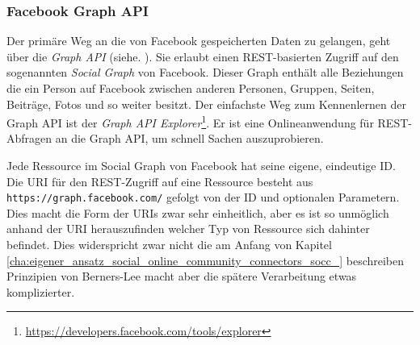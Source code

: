 
\subsubsection{Facebook Graph API} %
\label{ssub:facebook_graph_api}

Der primäre Weg an die von Facebook gespeicherten Daten zu gelangen, geht über die \emph{Graph API} (siehe. \cite{FacebookGraphAPI}). Sie erlaubt einen REST-basierten Zugriff auf den sogenannten \emph{Social Graph} von Facebook. Dieser Graph enthält alle Beziehungen die ein Person auf Facebook zwischen anderen Personen, Gruppen, Seiten, Beiträge, Fotos und so weiter besitzt. Der einfachste Weg zum Kennenlernen der Graph API ist der \emph{Graph API Explorer}\footnote{\url{https://developers.facebook.com/tools/explorer}}. Er ist eine Onlineanwendung für REST-Abfragen an die Graph API, um schnell Sachen auszuprobieren.

Jede Ressource im Social Graph von Facebook hat seine eigene, eindeutige ID. Die URI für den REST-Zugriff auf eine Ressource besteht aus \texttt{https://graph.facebook.com/} gefolgt von der ID und optionalen Parametern. Dies macht die Form der URIs zwar sehr einheitlich, aber es ist so unmöglich anhand der URI herauszufinden welcher Typ von Ressource sich dahinter befindet. Dies widerspricht zwar nicht die am Anfang von Kapitel \ref{cha:eigener_ansatz_social_online_community_connectors_socc_} beschreiben Prinzipien von Berners-Lee macht aber die spätere Verarbeitung etwas komplizierter. 

